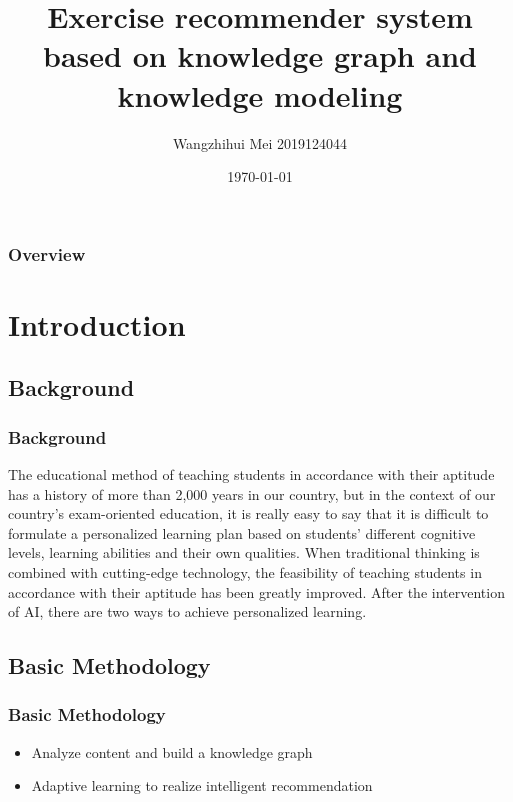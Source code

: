 \documentclass{beamer}
\title[Short title]{Exercise recommender system based on knowledge graph and knowledge modeling} %
\author{ Wangzhihui Mei 2019124044} %
\institute[JI] %
{
CCNU-UOW JI \\ %
\medskip
\textit{maywzh@gmail.com} %
}
\date{\today} %
\begin{document}
\begin{frame}
\titlepage %
\end{frame}

\begin{frame}
\frametitle{Overview} %
\tableofcontents %
\end{frame}


\section{Introduction}
\subsection{Background}
\begin{frame}
  \frametitle{Background}
  The educational method of teaching students in accordance with their aptitude has a history of more than 2,000 years in our country, but in the context of our country’s exam-oriented education, it is really easy to say that it is difficult to formulate a personalized learning plan based on students' different cognitive levels, learning abilities and their own qualities. When traditional thinking is combined with cutting-edge technology, the feasibility of teaching students in accordance with their aptitude has been greatly improved. After the intervention of AI, there are two ways to achieve personalized learning.

\end{frame}

\subsection{Basic Methodology}
\begin{frame}
  \frametitle{Basic Methodology}
  \begin{itemize}
    \item Analyze content and build a knowledge graph
    \item Adaptive learning to realize intelligent recommendation
  \end{itemize}

\end{frame}
\end{document}
